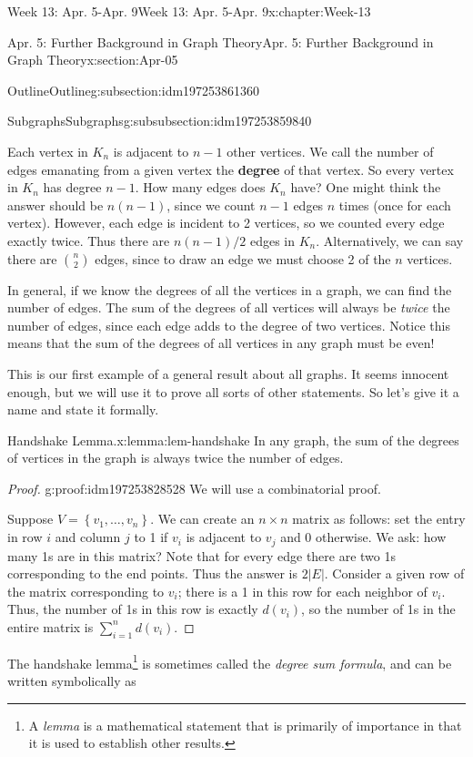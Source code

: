 \documentclass[oneside,10pt,]{book}
\newcommand{\terminology}[1]{\textbf{#1}}
\numberwithin{equation}{section}
\newcommand{\set}[1]{\left\{ {#1} \right\}}
\begin{document}
\begin{chapterptx}{Week 13: Apr. 5-Apr. 9}{}{Week 13: Apr. 5-Apr. 9}{}{}{x:chapter:Week-13}
\begin{sectionptx}{Apr. 5: Further Background in Graph Theory}{}{Apr. 5: Further Background in Graph Theory}{}{}{x:section:Apr-05}
\begin{subsectionptx}{Outline}{}{Outline}{}{}{g:subsection:idm197253861360}
\begin{subsubsectionptx}{Subgraphs}{}{Subgraphs}{}{}{g:subsubsection:idm197253859840}
\par
{} Each vertex in \(K_n\) is adjacent to \(n-1\) other vertices. We call the number of edges emanating from a given vertex the \terminology{degree} of that vertex. So every vertex in \(K_n\) has degree \(n-1\). How many edges does \(K_n\) have? One might think the answer should be \(n(n-1)\), since we count \(n-1\) edges \(n\) times (once for each vertex). However, each edge is incident to 2 vertices, so we counted every edge exactly twice. Thus there are \(n(n-1)/2\) edges in \(K_n\). Alternatively, we can say there are \({n \choose 2}\) edges, since to draw an edge we must choose 2 of the \(n\) vertices.%
\par
In general, if we know the degrees of all the vertices in a graph, we can find the number of edges. The sum of the degrees of all vertices will always be \emph{twice} the number of edges, since each edge adds to the degree of two vertices. Notice this means that the sum of the degrees of all vertices in any graph must be even!%
\par
This is our first example of a general result about all graphs.  It seems innocent enough, but we will use it to prove all sorts of other statements.  So let's give it a name and state it formally.%
\begin{lemma}{Handshake Lemma.}{}{x:lemma:lem-handshake}%
%
%
%
In any graph, the sum of the degrees of vertices in the graph is always twice the number of edges.%
\end{lemma}
\begin{proof}{}{g:proof:idm197253828528}
We will use a combinatorial proof.%
\par
Suppose \(V = \set{v_1,\ldots,v_n}\). We can create an \(n\times n\) matrix as follows: set the entry in row \(i\) and column \(j\) to 1 if \(v_i\) is adjacent to \(v_j\) and 0 otherwise. We ask: how many 1s are in this matrix? Note that for every edge there are two 1s corresponding to the end points. Thus the answer is \(2|E|\). Consider a given row of the matrix corresponding to \(v_i\); there is a 1 in this row for each neighbor of \(v_i\). Thus, the number of 1s in this row is exactly \(d(v_i)\), so the number of 1s in the entire matrix is \(\sum_{i=1}^n d(v_i)\).%
\end{proof}
The handshake lemma\footnote{A \emph{lemma} is a mathematical statement that is primarily of importance in that it is used to establish other results.\label{g:fn:idm197253822288}} is sometimes called the \emph{degree sum formula}, and can be written symbolically as%

\end{subsubsectionptx}
\end{subsectionptx}
\end{sectionptx}
\end{chapterptx}
\end{document}
